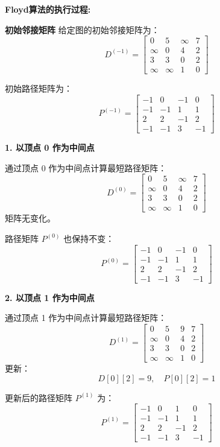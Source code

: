 \documentclass[lang=cn,newtx,10pt,scheme=chinese]{../elegantbook}
\begin{document}
\textbf{Floyd算法的执行过程:}
 



\textbf{初始邻接矩阵}
给定图的初始邻接矩阵为：
\[
D^{(-1)} =
\begin{bmatrix}
0 & 5 & \infty & 7 \\
\infty & 0 & 4 & 2 \\
3 & 3 & 0 & 2 \\
\infty & \infty & 1 & 0
\end{bmatrix}
\]

初始路径矩阵为：
\[
P^{(-1)} =
\begin{bmatrix}
-1 & 0 & -1 & 0 \\
-1 & -1 & 1 & 1 \\
2 & 2 & -1 & 2 \\
-1 & -1 & 3 & -1
\end{bmatrix}
\]


\textbf{1. 以顶点 0 作为中间点}

通过顶点 0 作为中间点计算最短路径矩阵：
\[
D^{(0)} =
\begin{bmatrix}
0 & 5 & \infty & 7 \\
\infty & 0 & 4 & 2 \\
3 & 3 & 0 & 2 \\
\infty & \infty & 1 & 0
\end{bmatrix}
\]
矩阵无变化。

路径矩阵 \( P^{(0)} \) 也保持不变：
\[
P^{(0)} =
\begin{bmatrix}
-1 & 0 & -1 & 0 \\
-1 & -1 & 1 & 1 \\
2 & 2 & -1 & 2 \\
-1 & -1 & 3 & -1
\end{bmatrix}
\]

\textbf{2. 以顶点 1 作为中间点}

通过顶点 1 作为中间点计算最短路径矩阵：
\[
D^{(1)} =
\begin{bmatrix}
0 & 5 & 9 & 7 \\
\infty & 0 & 4 & 2 \\
3 & 3 & 0 & 2 \\
\infty & \infty & 1 & 0
\end{bmatrix}
\]
更新：
\[
D[0][2] = 9, \quad P[0][2] = 1
\]

更新后的路径矩阵 \( P^{(1)} \) 为：
\[
P^{(1)} =
\begin{bmatrix}
-1 & 0 & 1 & 0 \\
-1 & -1 & 1 & 1 \\
2 & 2 & -1 & 2 \\
-1 & -1 & 3 & -1
\end{bmatrix}
\]
\end{document}
